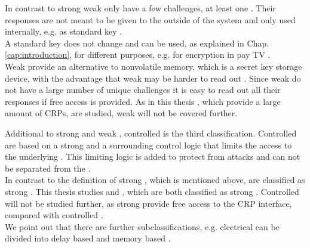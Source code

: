 In contrast to strong \pufs weak \pufs only have a few challenges, at least one \cite{Ruhrmair2014PUFsGlance}.
Their responses are not meant to be given to the outside of the system and only used internally, e.g. as standard key \cite{Ruhrmair2012AnPUFs}.\\
A standard key does not change and can be used, as explained in Chap. \ref{cap:introduction}, for different purposes, e.g. for encryption in pay TV \cite{2016PirateDecryption}.\\
Weak \pufs provide an alternative to nonvolatile memory, which is a secret key storage device, with the advantage that weak \pufs may be harder to read out \cite{Lim2005ExtractingCircuits}.
Since weak \pufs do not have a large number of unique challenges it is easy to read out all their responses if free access is provided.
As in this thesis \pufs, which provide a large amount of \acp{CRP}, are studied, weak \pufs will not be covered further.

Additional to strong \puf and weak \puf, controlled \pufs is the third classification.
Controlled \pufs are based on a strong \pufs and a surrounding control logic that limits the access to the underlying \puf.
This limiting logic is added to protect \pufs from attacks and can not be separated from the \puf \cite{Ruhrmair2013PUFData,Gassend2007ControlledFunctions}.\\
In contrast to the definition of strong \pufs, which is mentioned above, \apufs are classified as strong \puf \cite{Ruhrmair2010StrongProofs}.
This thesis studies \apufs and \xpufs, which are both classified as strong \puf.  
Controlled \pufs will not be studied further, as strong \pufs provide free access to the \ac{CRP} interface, compared with controlled \pufs.\\
We point out that there are further subclassifications, e.g. electrical \pufs can be divided into delay based \pufs and memory based \pufs \cite{Saha2016TV-PUFPUF}.


